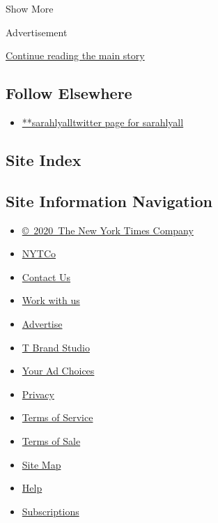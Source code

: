 Show More

Advertisement

\protect\hyperlink{after-mid2}{Continue reading the main story}

\hypertarget{follow-elsewhere}{%
\subsection{Follow Elsewhere}\label{follow-elsewhere}}

\begin{itemize}
\tightlist
\item
  \href{https://twitter.com/sarahlyall}{**sarahlyalltwitter page for
  sarahlyall}
\end{itemize}

\hypertarget{site-index}{%
\subsection{Site Index}\label{site-index}}

\hypertarget{site-information-navigation}{%
\subsection{Site Information
Navigation}\label{site-information-navigation}}

\begin{itemize}
\tightlist
\item
  \href{https://help.nytimes3xbfgragh.onion/hc/en-us/articles/115014792127-Copyright-notice}{©~2020~The
  New York Times Company}
\end{itemize}

\begin{itemize}
\tightlist
\item
  \href{https://www.nytco.com/}{NYTCo}
\item
  \href{https://help.nytimes3xbfgragh.onion/hc/en-us/articles/115015385887-Contact-Us}{Contact
  Us}
\item
  \href{https://www.nytco.com/careers/}{Work with us}
\item
  \href{https://nytmediakit.com/}{Advertise}
\item
  \href{http://www.tbrandstudio.com/}{T Brand Studio}
\item
  \href{https://www.nytimes3xbfgragh.onion/privacy/cookie-policy\#how-do-i-manage-trackers}{Your
  Ad Choices}
\item
  \href{https://www.nytimes3xbfgragh.onion/privacy}{Privacy}
\item
  \href{https://help.nytimes3xbfgragh.onion/hc/en-us/articles/115014893428-Terms-of-service}{Terms
  of Service}
\item
  \href{https://help.nytimes3xbfgragh.onion/hc/en-us/articles/115014893968-Terms-of-sale}{Terms
  of Sale}
\item
  \href{https://spiderbites.nytimes3xbfgragh.onion}{Site Map}
\item
  \href{https://help.nytimes3xbfgragh.onion/hc/en-us}{Help}
\item
  \href{https://www.nytimes3xbfgragh.onion/subscription?campaignId=37WXW}{Subscriptions}
\end{itemize}
